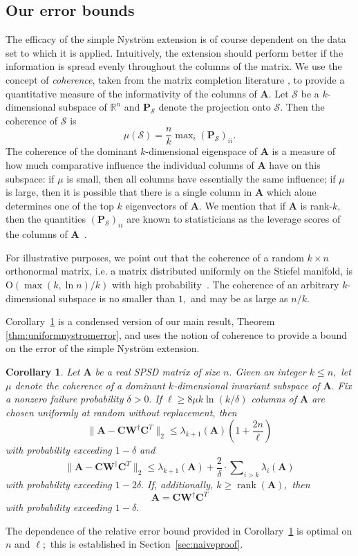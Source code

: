 \documentclass[11pt,letterpaper,twoside,reqno,nosumlimits]{amsart}
\def\pinv{\dagger}
\def\transp{T}
\newcommand{\mat}[1]{\ensuremath{\mathbf{#1}}}
\newcommand{\R}{\ensuremath{\mathbb{R}}}
\newcommand{\snorm}[1]{\ensuremath{\big\|#1\big\|_2}}
\DeclareMathOperator{\rank}{rank}
\newtheorem{cor}{Corollary}
\theoremstyle{remark}
\begin{document}
\subsection{Our error bounds}The efficacy of the simple Nystr\"om extension is of course dependent on the data set to which it is applied. Intuitively, the extension should perform better if the information is spread evenly throughout the columns of the matrix. We use the concept of \emph{coherence}, taken from the matrix completion literature \cite{CR09}, to	provide a quantitative measure of the informativity of the columns of $\mat{A}.$ Let $\mathcal{S}$ be a $k$-dimensional subspace of $\R^n$ and $\mat{P}_{\mathcal{S}}$ denote the projection onto $\mathcal{S}.$ Then the coherence of $\mathcal{S}$ is
\[
 \mu(\mathcal{S}) = \frac{n}{k} \max\nolimits_i (\mat{P}_{\mathcal{S}})_{ii}.
\]
The coherence of the dominant $k$-dimensional eigenspace of $\mat{A}$ is a measure of how much comparative influence the individual columns of $\mat{A}$ have on this subspace: if $\mu$ is small, then all columns have essentially the same influence; if $\mu$ is large, then it is possible that there is a single column in $\mat{A}$ which alone determines one of the top $k$ eigenvectors of $\mat{A}.$ We mention that if $\mat{A}$ is rank-$k$, then the quantities $(\mat{P}_{\mathcal{S}})_{ii}$ are known to statisticians as the leverage scores of the columns of $\mat{A}$~\cite{DM10}.

For illustrative purposes, we point out that the coherence of a random $k \times n$ orthonormal matrix, i.e. a matrix distributed uniformly on the Stiefel manifold, is $\mathrm{O}(\max(k, \ln n)/k)$ with high probability~\cite{CR09}. The coherence of an arbitrary $k$-dimensional subspace is no smaller than $1,$ and may be as large as $n/k.$ 

Corollary~\ref{cor:simpleuniformnystromerror} is a condensed version of our main result, Theorem \ref{thm:uniformnystromerror}, and uses the notion of coherence to provide a bound on the error of the simple Nystr\"om extension. 

\begin{cor}
 Let $\mat{A}$ be a real SPSD matrix of size $n.$ Given an integer $k \leq n,$ let
$\mu$ denote the coherence of a dominant  $k$-dimensional invariant subspace of $\mat{A}.$
Fix a nonzero failure probability $\delta > 0.$ If $\ell \geq 8 \mu k \ln(k/\delta)$ columns of $\mat{A}$ are chosen uniformly at random without replacement, then 
\[
\snorm{\mat{A} - \mat{C} \mat{W}^\pinv \mat{C}^\transp} \leq \lambda_{k+1}(\mat{A}) \left(1 + \frac{2n}{\ell} \right) 
\]
with probability exceeding $1-\delta$ and
\[
 \snorm{\mat{A} - \mat{C} \mat{W}^\pinv \mat{C}^\transp} \leq \lambda_{k+1}(\mat{A}) + \frac{2}{\delta} \cdot \sum\nolimits_{i>k}\lambda_i(\mat{A})
\]
with probability exceeding $1 - 2\delta.$ If, additionally, $k \geq \rank(\mat{A}),$ then
\[
 \mat{A} = \mat{C} \mat{W}^\pinv \mat{C}^\transp
\]
with probability exceeding $1-\delta.$


\label{cor:simpleuniformnystromerror}
\end{cor}
The dependence of the relative error bound provided in Corollary~\ref{cor:simpleuniformnystromerror} is optimal on $n$ and $\ell;$ this is established in Section~\ref{sec:naiveproof}.
\end{document}
